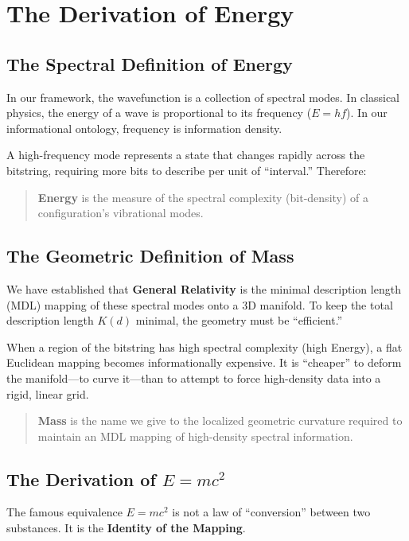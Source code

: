 \chapter{The Derivation of Energy}

\section{The Spectral Definition of Energy}

In our framework, the wavefunction is a collection of spectral modes. In classical physics, the energy of a wave is proportional to its frequency ($E=hf$). In our informational ontology, frequency is information density.

A high-frequency mode represents a state that changes rapidly across the bitstring, requiring more bits to describe per unit of ``interval.'' Therefore:
\begin{quote}
\textbf{Energy} is the measure of the spectral complexity (bit-density) of a configuration's vibrational modes.
\end{quote}

\section{The Geometric Definition of Mass}

We have established that \textbf{General Relativity} is the minimal description length (MDL) mapping of these spectral modes onto a 3D manifold. To keep the total description length $K(d)$ minimal, the geometry must be ``efficient.''

When a region of the bitstring has high spectral complexity (high Energy), a flat Euclidean mapping becomes informationally expensive. It is ``cheaper'' to deform the manifold—to curve it—than to attempt to force high-density data into a rigid, linear grid.

\begin{quote}
\textbf{Mass} is the name we give to the localized geometric curvature required to maintain an MDL mapping of high-density spectral information.
\end{quote}

\section{The Derivation of $E=mc^2$}

The famous equivalence $E=mc^2$ is not a law of ``conversion'' between two substances. It is the \textbf{Identity of the Mapping}.

